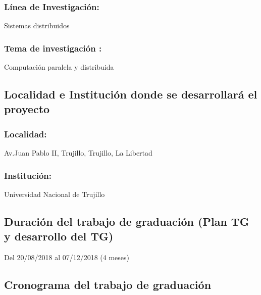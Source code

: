     \subsubsection{Línea de Investigación:} 
    Sistemas distribuidos
                
    \subsubsection{Tema de investigación :}
    Computación paralela y distribuida


\subsection{Localidad e Institución donde se desarrollará el proyecto }
  
    \subsubsection{Localidad:} 
    Av.Juan Pablo II, Trujillo, Trujillo, La Libertad

    \subsubsection{Institución:}
    Universidad Nacional de Trujillo

\subsection{Duración del trabajo de graduación (Plan TG y desarrollo del TG)}
Del 20/08/2018 al 07/12/2018 (4 meses)

\subsection{Cronograma del trabajo de graduación}

